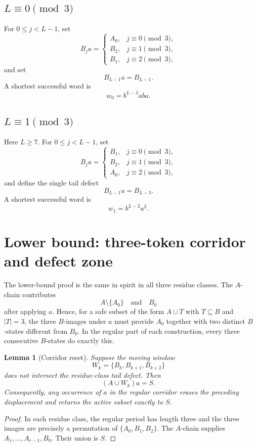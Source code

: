 \documentclass[11pt]{article}
\newtheorem{lemma}{Lemma}
\theoremstyle{definition}
\theoremstyle{remark}
\begin{document}
\subsection{$L\equiv0\pmod3$}
For $0\le j<L-1$, set
\[
B_j a=\begin{cases}
A_0,&j\equiv0\pmod3,\\
B_2,&j\equiv1\pmod3,\\
B_1,&j\equiv2\pmod3,
\end{cases}
\]
and set
\[
B_{L-1}a=B_{L-1}.
\]
A shortest successful word is
\begin{equation}\label{eq:w0}
w_0=b^{L-3}aba.
\end{equation}

\subsection{$L\equiv1\pmod3$}
Here $L\ge7$. For $0\le j<L-1$, set
\[
B_j a=\begin{cases}
B_1,&j\equiv0\pmod3,\\
B_2,&j\equiv1\pmod3,\\
A_0,&j\equiv2\pmod3,
\end{cases}
\]
and define the single tail defect
\[
B_{L-1}a=B_{L-3}.
\]
A shortest successful word is
\begin{equation}\label{eq:w1}
w_1=b^{L-2}a^2.
\end{equation}

\section{Lower bound: three-token corridor and defect zone}
The lower-bound proof is the same in spirit in all three residue classes. The $A$-chain contributes
\[
A\setminus\{A_0\}\quad\text{and}\quad B_0
\]
after applying $a$. Hence, for a safe subset of the form $A\cup T$ with $T\subseteq B$ and $|T|=3$, the three $B$-images under $a$ must provide $A_0$ together with two distinct $B$-states different from $B_0$. In the regular part of each construction, every three consecutive $B$-states do exactly this.

\begin{lemma}[Corridor reset]\label{lem:corridor}
Suppose the moving window
\[
W_k=\{B_k,B_{k+1},B_{k+2}\}
\]
does not intersect the residue-class tail defect. Then
\[
(A\cup W_k)a=S.
\]
Consequently, any occurrence of $a$ in the regular corridor erases the preceding displacement and returns the active subset exactly to $S$.
\end{lemma}
\begin{proof}
In each residue class, the regular period has length three and the three images are precisely a permutation of $\{A_0,B_1,B_2\}$. The $A$-chain supplies $A_1,\ldots,A_{r-1},B_0$. Their union is $S$.
\end{proof}
\end{document}
